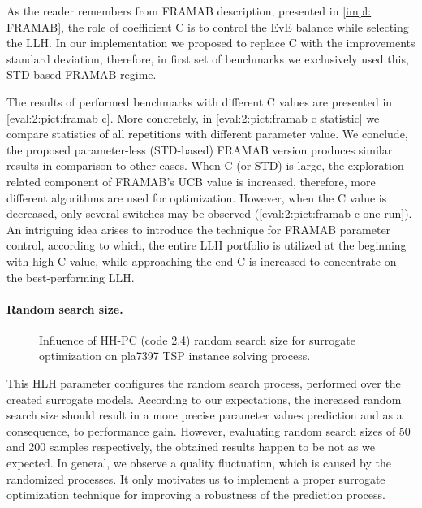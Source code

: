 As the reader remembers from FRAMAB description, presented in \cref{impl: FRAMAB}, the role of coefficient C is to control the EvE balance while selecting the LLH. In our implementation we proposed to replace C with the improvements standard deviation, therefore, in first set of benchmarks we exclusively used this, STD-based FRAMAB regime.

The results of performed benchmarks with different C values are presented in \cref{eval:2:pict:framab c}. More concretely, in \cref{eval:2:pict:framab c statistic} we compare statistics of all repetitions with different parameter value. We conclude, the proposed parameter-less (STD-based) FRAMAB version produces similar results in comparison to other cases. When C (or STD) is large, the exploration-related component of FRAMAB's UCB value is increased, therefore, more different algorithms are used for optimization. However, when the C value is decreased, only several switches may be observed (\cref{eval:2:pict:framab c one run}). An intriguing idea arises to introduce the technique for FRAMAB parameter control, according to which, the entire LLH portfolio is utilized at the beginning with high C value, while approaching the end C is increased to concentrate on the best-performing LLH.


\paragraph{Random search size.}
\begin{figure}[h]
	\centering
	\vspace{-10pt}
	
	\caption{Influence of HH-PC (code 2.4) random search size for surrogate optimization on pla7397 TSP instance solving process.}
	\vspace{-5pt}
	\label{eval:2:pict: random search size}
\end{figure}
This HLH parameter configures the random search process, performed over the created surrogate models. According to our expectations, the increased random search size should result in a more precise parameter values prediction and as a consequence, to performance gain. However, evaluating random search sizes of 50 and 200 samples respectively, the obtained results happen to be not as we expected. In general, we observe a quality fluctuation, which is caused by the randomized processes. It only motivates us to implement a proper surrogate optimization technique for improving a robustness of the prediction process.

